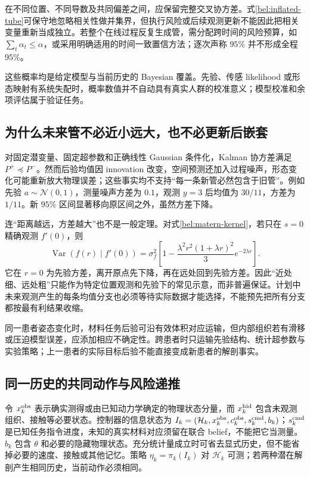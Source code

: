 \documentclass[11pt,a4paper]{article}
\numberwithin{equation}{section}
\theoremstyle{definition}
\begin{document}
在不同位置、不同导数及共同偏差之间，应保留完整交叉协方差。式\eqref{bel:inflated-tube}可保守地忽略相关性做并集界，但执行风险或后续观测更新不能因此把相关变量重新当成独立。若整个在线过程反复生成管，需分配跨时间的风险预算，如 $\sum_t\alpha_t\le\alpha$，或采用明确适用的时间一致置信方法；逐次声称 $95\%$ 并不形成全程 $95\%$。

这些概率均是给定模型与当前历史的 Bayesian 覆盖。先验、传感 likelihood 或形态映射有系统失配时，概率数值并不自动具有真实人群的校准意义；模型校准和余项评估属于验证任务。

\subsection{为什么未来管不必近小远大，也不必更新后嵌套}
\label{bel:nonmonotone}

对固定潜变量、固定超参数和正确线性 Gaussian 条件化，Kalman 协方差满足 $P^+\preceq P^-$。然而后验均值因 innovation 改变，空间预测还加入过程噪声，形态变化可能重新放大物理误差；这些事实均不支持“每一条新管必然包含于旧管”。例如先验 $a\sim\mathcal N(0,1)$，测量噪声方差为 $0.1$，观测 $y=3$ 后均值为 $30/11$，方差为 $1/11$。新 $95\%$ 区间显著移向原区间之外，虽然方差下降。

连“距离越远，方差越大”也不是一般定理。对式\eqref{bel:matern-kernel}，若只在 $s=0$ 精确观测 $f'(0)$，则
\begin{equation}
 \operatorname{Var}(f(r)\mid f'(0))
 =\sigma_f^2\left[1-
 \frac{\lambda^2r^2(1+\lambda r)^2}{3}e^{-2\lambda r}\right].
 \label{bel:variance-counterexample}
\end{equation}
它在 $r=0$ 为先验方差，离开原点先下降，再在远处回到先验方差。因此“近处细、远处粗”只能作为特定位置观测和先验下的常见示意，而非普遍保证。计划中未来观测产生的每条均值分支也必须等待实际数据才能选择，不能预先把所有分支都按最有利结果收缩。

同一患者姿态变化时，材料任务后验可沿有效体积对应运输，但内部组织若有滑移或压迫模型误差，应添加相应不确定性。跨患者时只运输先验结构、统计超参数与实验策略；上一患者的实际目标后验不能直接变成新患者的解剖事实。

\subsection{同一历史的共同动作与风险递推}
\label{bel:causal}

令 $x_k^{\rm obs}$ 表示确实测得或由已知动力学确定的物理状态分量，而 $x_k^{\rm hid}$ 包含未观测组织、接触等必要状态。控制器的信息状态为 $I_k=(\mathcal H_k,x_k^{\rm obs},c_k^{\rm obs},s_k^{\rm cmd},b_k)$；$s_k^{\rm cmd}$ 是已知任务指令进度，未知的真实材料对应须留在联合 belief，不能把它当测量。$b_k$ 包含 $\theta$ 和必要的隐藏物理状态。充分统计量成立时可省去显式历史，但不能省掉必要的速度、接触或其他记忆。策略 $\eta_k=\pi_k(I_k)$ 对 $\mathcal H_k$ 可测；若两种潜在解剖产生相同历史，当前动作必须相同。
\end{document}
